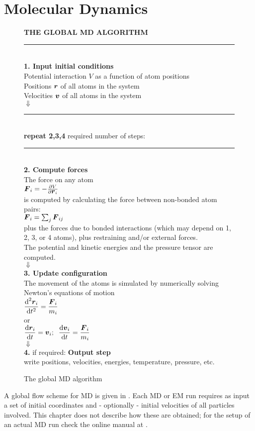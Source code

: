 \section{Molecular Dynamics}
\label{sec:MD}
\begin{figure}
\begin{center}
\addtolength{\fboxsep}{0.5cm}
\begin{shadowenv}[12cm]
{\large \bf THE GLOBAL MD ALGORITHM}
\rule{\textwidth}{2pt} \\
{\bf 1. Input initial conditions}\\[2ex]
Potential interaction $V$ as a function of atom positions\\
Positions $\mbox{\boldmath ${r}$}$ of all atoms in the system\\
Velocities $\mbox{\boldmath ${v}$}$ of all atoms in the system \\
$\Downarrow$\\
\rule{\textwidth}{1pt}\\
{\bf repeat 2,3,4} required number of steps:\\
\rule{\textwidth}{1pt}\\
{\bf 2. Compute forces} \\[1ex]
The force on any atom  \\[1ex]
$\mbox{\boldmath ${F}$}_i = - \frac{\partial V}{\partial \mbox{\boldmath ${r}$}_i}$ \\[1ex]
is computed by calculating the force between non-bonded atom pairs: \\
$\mbox{\boldmath ${F}$}_i = \sum_j \mbox{\boldmath ${F}$}_{ij}$ \\
plus the forces due to bonded interactions (which may depend on 1, 2,
3, or 4 atoms), plus restraining and/or external forces. \\
The potential and kinetic energies and the pressure tensor are computed. \\   
$\Downarrow$\\
{\bf 3. Update configuration} \\[1ex]
The movement of the atoms is simulated by numerically solving Newton's
equations of motion \\[1ex]
$\displaystyle
\frac {\mbox{d}^2\mbox{\boldmath ${r}$}_i}{\mbox{d} t^2} = \frac{\mbox{\boldmath ${F}$}_i}{m_i} $ \\
or \\
$\displaystyle
\frac{\mbox{d}\mbox{\boldmath ${r}$}_i}{\mbox{d} t} = \mbox{\boldmath ${v}$}_i ; \;\;
\frac{\mbox{d}\mbox{\boldmath ${v}$}_i}{\mbox{d} t} = \frac{\mbox{\boldmath ${F}$}_i}{m_i} $ \\[1ex]
$\Downarrow$ \\
{\bf 4.} if required: {\bf Output step} \\
write positions, velocities, energies, temperature, pressure, etc. \\
\end{shadowenv}
\caption{The global MD algorithm}
\label{fig:global}
\end{center}
\end{figure}
A global flow scheme for MD is given in . Each
MD or  EM run requires as input a set of initial coordinates and -
optionally - initial velocities of all particles involved. This
chapter does not describe how these are obtained; for the setup of an
actual MD run check the online manual at {\wwwpage}.

